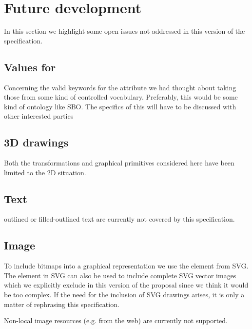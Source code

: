 
\section{Future development}
\label{future}

In this section we highlight some open issues not addressed in this version
of the \Render specification.


\subsection{Values for }


Concerning the valid 
keywords for the  attribute we had thought about taking those 
from some kind of controlled vocabulary. Preferably, this would be some kind of 
ontology like SBO. The specifics of this will have to be discussed with other 
interested parties

\subsection{3D drawings}
Both the transformations and graphical primitives considered here have been limited to the 2D situation. 

\subsection{Text}
outlined or filled-outlined text are currently not covered by this specification.

\subsection{Image}
To include bitmaps into a graphical representation we use the \Image element 
from SVG. The \Image element in SVG can also be used to include complete SVG 
vector images which we explicitly exclude in this version of the proposal 
since we think it would be too complex. If the need for the inclusion of SVG 
drawings arises, it is only a matter of rephrasing this specification.

Non-local image resources (e.g. from the web) are currently not supported.
